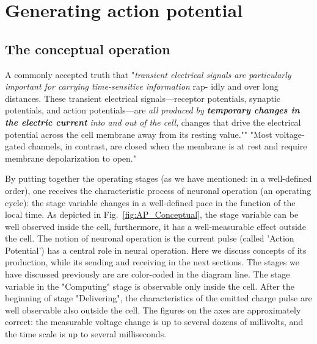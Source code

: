 
\section[Action potential]{Generating action potential\label{sec:Single-ActionPotential}}


\subsection[The concept]{The conceptual operation\label{sec:Single-OperationConceptual}}


A commonly accepted truth that "\textit{\hypertarget{TransientState}{transient} electrical signals are particularly
important for carrying time-sensitive information} rap-
idly and over long distances. These transient electrical
signals—receptor potentials, synaptic potentials, and
action potentials—are \textit{all produced by \textbf{temporary
changes in the electric current }into and out of the
cell}, changes that drive the electrical potential across
the cell membrane away from its resting value."\cite{PrinciplesNeuralScience:2013}"
"Most voltage-gated
channels, in contrast, are closed when the membrane is
at rest and require membrane depolarization to open."

By putting together the operating stages (as we have mentioned: in a well-defined order), one receives the
characteristic process of neuronal operation (an operating cycle): the stage variable changes in a well-defined pace in the function of the local time. As depicted in Fig.~\ref{fig:AP_Conceptual}, the stage variable can be well observed inside the cell, furthermore, it has a well-measurable effect outside the cell.  The notion 
of neuronal operation is the  current pulse (called 'Action Potential') has a central role in neural operation.  Here we discuss concepts of its production, while its sending and receiving in the next sections. The stages we have discussed previously are  are color-coded in the diagram line. 
The stage variable in the "Computing" stage is observable 
only inside the cell. After the beginning of stage "Delivering", the characteristics of the emitted charge pulse are well observable also outside the cell. The figures on the axes are approximately correct: the measurable voltage change is up to several dozens of millivolts, and the time scale
is up to several milliseconds. 
%

